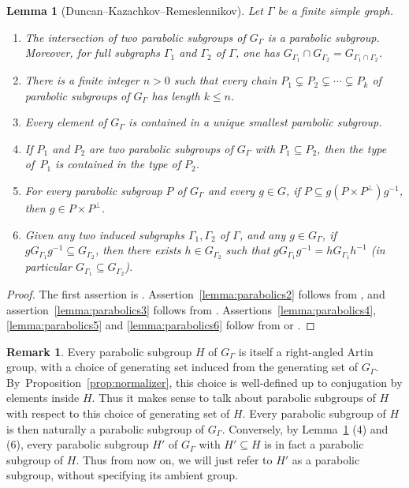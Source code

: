 \documentclass[JEP,XML,SOM,Unicode,NoFloatCountersInSection,published]{cedram}
\theoremstyle{plain}
\newtheorem{lemma}[theo]{Lemma}
\theoremstyle{definition}
\newtheorem{rk}[theo]{Remark}
\begin{document}
\begin{lemma}[Duncan--Kazachkov--Remeslennikov]\label{lemma:parabolics}
Let $\Gamma$ be a finite simple graph.
\begin{enumerate}
\item\label{lemma:parabolics1} The intersection of two parabolic subgroups of $G_\Gamma$ is a parabolic subgroup. Moreover, for full subgraphs $\Gamma_1$ and $\Gamma_2$ of $\Gamma$, one has $G_{\Gamma_1}\cap G_{\Gamma_2}=G_{\Gamma_1\cap\Gamma_2}$.
\item\label{lemma:parabolics2} There is a finite integer $n>0$ such that every chain $P_1\subsetneq P_2\subsetneq\cdots\subsetneq P_k$ of parabolic subgroups of $G_\Gamma$ has length $k\le n$.
\item\label{lemma:parabolics3} Every element of $G_\Gamma$ is contained in a unique smallest parabolic subgroup.
\item\label{lemma:parabolics4} If $P_1$ and $P_2$ are two parabolic subgroups of $G_\Gamma$ with $P_1\subseteq P_2$, then the type of~$P_1$ is contained in the type of $P_2$.
\item\label{lemma:parabolics5} For every parabolic subgroup $P$ of $G_\Gamma$ and every $g\in G$, if $P\subseteq g(P\times P^\perp)g^{-1}$, then $g\in P\times P^\perp$.
\item\label{lemma:parabolics6} Given any two induced subgraphs $\Gamma_1,\Gamma_2$ of $\Gamma$, and any $g\in G_\Gamma$, if \hbox{$g G_{\Gamma_1}g^{-1}\!\!\subseteq\! G_{\Gamma_2}$}, then there exists $h\in G_{\Gamma_2}$ such that $g G_{\Gamma_1}g^{-1}=h G_{\Gamma_1}h^{-1}$ (in particular $G_{\Gamma_1}\subseteq G_{\Gamma_2}$).
\end{enumerate}
\end{lemma}

\begin{proof}
The first assertion is \cite[Prop.\,2.6 \& Lem.\,2.7]{duncan2007parabolic}. Assertion~\eqref{lemma:parabolics2} follows from \cite[Prop.\,2.6]{duncan2007parabolic}, and assertion~\eqref{lemma:parabolics3} follows from \cite[Prop.\,2.8]{duncan2007parabolic}. Assertions~\eqref{lemma:parabolics4}, \eqref{lemma:parabolics5} and \eqref{lemma:parabolics6} follow from \cite[Cor.\,2.5]{duncan2007parabolic} or \cite[Prop.\,2.2]{charney2007automorphisms}.
\end{proof}

\begin{rk}
\label{remark:parabolic in parabolic}
Every parabolic subgroup $H$ of $G_\Gamma$ is itself a right-angled Artin group, with a choice of generating set induced from the generating set of $G_\Gamma$. By~Proposition~\ref{prop:normalizer}, this choice is well-defined up to conjugation by elements inside $H$. Thus it makes sense to talk about parabolic subgroups of $H$ with respect to this choice of generating set of $H$. Every parabolic subgroup of $H$ is then naturally a parabolic subgroup of $G_\Gamma$. Conversely, by Lemma~\ref{lemma:parabolics} (4) and (6), every parabolic subgroup $H'$ of $G_\Gamma$ with $H'\subseteq H$ is in fact a parabolic subgroup of $H$. Thus from now on, we will just refer to $H'$ as a parabolic subgroup, without specifying its ambient group.
\end{rk}
\end{document}
